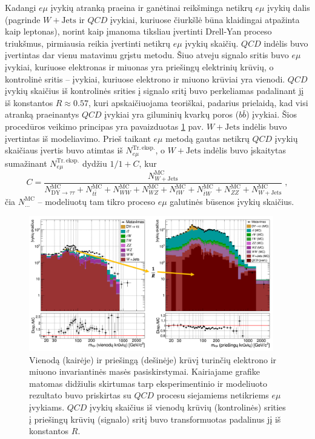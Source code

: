 \documentclass[a4paper, 12pt]{article}
\newcommand{\emu}{e\mu}
\newlength\q
\begin{document}
Kadangi $\emu$ įvykių atranką praeina ir ganėtinai reikšminga netikrų $\emu$ įvykių dalis (pagrinde
$W+\mathrm{Jets}$ ir $QCD$ įvykiai, kuriuose čiurkšlė būna klaidingai atpažinta kaip leptonas),
norint kaip įmanoma tiksliau įvertinti Drell-Yan proceso triukšmus, pirmiausia reikia
įvertinti netikrų $\emu$ įvykių skaičių.
$QCD$ indėlis buvo įvertintas dar vienu matavimu grįstu metodu.
Šiuo atveju signalo sritis buvo $\emu$ įvykiai, kuriuose elektronas ir miuonas yra priešingų elektrinių
krūvių, o kontrolinė sritis -- įvykiai, kuriuose elektrono ir miuono krūviai yra vienodi.
$QCD$ įvykių skaičius iš kontrolinės srities į signalo sritį buvo perkeliamas padalinant jį iš
konstantos $R\approx 0.57$, kuri apskaičiuojama teoriškai, padarius prielaidą, kad visi atranką
praeinantys $QCD$ įvykiai yra giluminių kvarkų poros ($b\bar{b}$) įvykiai.
Šios procedūros veikimo principas yra pavaizduotas \ref{fig:emuQCD} pav.
$W+\mathrm{Jets}$ indėlis buvo įvertintas iš modeliavimo.
Prieš taikant $\emu$ metodą gautas netikrų $QCD$ įvykių skaičiaus įvertis buvo atimtas iš
$N_{e\mu}^{\mathrm{Tr. \, eksp.}}$, o $W+\mathrm{Jets}$ indėlis buvo įskaitytas sumažinant
$N_{e\mu}^{\mathrm{Tr. \, eksp.}}$ dydžiu $1/1+C$, kur
\begin{equation*}
	C = \frac{ N_{W+\mathrm{Jets}}^{\mathrm{MC}} } { N_{\mathrm{DY}\rightarrow\tau\tau}^{\mathrm{MC}} + 
	N_{t\bar{t}}^{\mathrm{MC}} + N_{WW}^{\mathrm{MC}} + N_{WZ}^{\mathrm{MC}} + N_{tW}^{\mathrm{MC}} + N_{\bar{t}W}^{\mathrm{MC}} +
	N_{ZZ}^{\mathrm{MC}} + N_{W+\mathrm{Jets}}^{\mathrm{MC}} } \; ,
\end{equation*}
čia $N^{\mathrm{MC}}_{...}$ -- modeliuotų tam tikro proceso $\emu$ galutinės būsenos įvykių skaičius.

\begin{figure}[H]
	\includegraphics[width=0.95\textwidth]{emuQCDest.png}
	\vspace{-0.2cm}
	\caption{\label{fig:emuQCD} Vienodą (kairėje) ir priešingą (dešinėje) krūvį turinčių elektrono ir
	miuono invariantinės masės pasiskirstymai.
	Kairiajame grafike matomas didžiulis skirtumas tarp eksperimentinio ir modeliuoto rezultato buvo
	priskirtas su $QCD$ procesu siejamiems netikriems $\emu$ įvykiams.
	$QCD$ įvykių skaičius iš vienodų krūvių (kontrolinės) srities į priešingų krūvių (signalo) sritį
	buvo transformuotas padalinus jį iš konstantos $R$.}
\end{figure}
\end{document}
